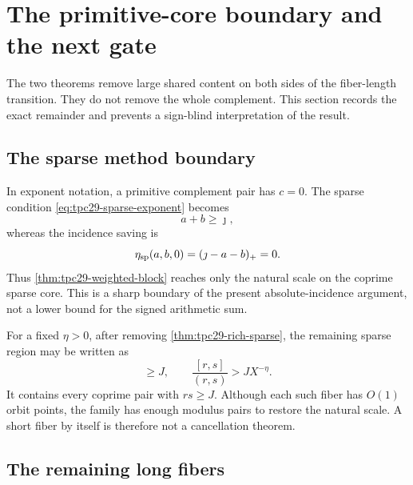 \section{The primitive-core boundary and the next gate}
\label{sec:tpc29-primitive-boundary}

The two theorems remove large shared content on both sides of the
fiber-length transition.  They do not remove the whole complement.
This section records the exact remainder and prevents a sign-blind
interpretation of the result.

\subsection{The sparse method boundary}

In exponent notation, a primitive complement pair has $c=0$.  The
sparse condition \eqref{eq:tpc29-sparse-exponent} becomes
\begin{equation}
 a+b\ge\jmath,
 \label{eq:tpc29-primitive-sparse-condition}
\end{equation}
whereas the incidence saving is
\begin{equation}
 \eta_{\rm sp}(a,b,0)
 =(\jmath-a-b)_+=0.
 \label{eq:tpc29-primitive-zero-saving}
\end{equation}
Thus \cref{thm:tpc29-weighted-block} reaches only the natural scale on
the coprime sparse core.  This is a sharp boundary of the present
absolute-incidence argument, not a lower bound for the signed
arithmetic sum.

For a fixed $\eta>0$, after removing
\cref{thm:tpc29-rich-sparse}, the remaining sparse region may be
written as
\begin{equation}
 [r,s]\ge J,
 \qquad
 \frac{[r,s]}{(r,s)}>JX^{-\eta}.
 \label{eq:tpc29-remaining-sparse}
\end{equation}
It contains every coprime pair with $rs\ge J$.  Although each such
fiber has $O(1)$ orbit points, the family has enough modulus pairs to
restore the natural scale.  A short fiber by itself is therefore not a
cancellation theorem.

\subsection{The remaining long fibers}

